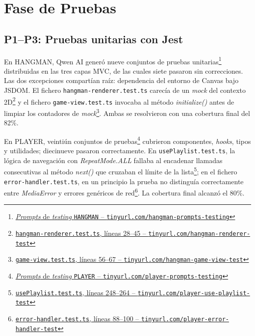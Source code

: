 \section{Fase de Pruebas} \label{sec:dev-testing}

\subsection{P1--P3: Pruebas unitarias con Jest}

En \ac{HANGMAN}, Qwen AI generó nueve conjuntos de pruebas unitarias\footnote{\href{https://github.com/alu0101549491/TFG-Fabian-Gonzalez-Lence/tree/main/resources/prompts/1-TheHangmanGame/5-TestingPorModulo}{\textit{Prompts} de \textit{testing} \texttt{HANGMAN} -- \texttt{tinyurl.com/hangman-prompts-testing}}} distribuidas en las tres capas \ac{MVC}, de las cuales siete pasaron sin correcciones. Las dos excepciones compartían raíz: dependencia del entorno de Canvas bajo JSDOM. El fichero \texttt{hangman-renderer.test.ts} carecía de un \textit{mock} del contexto 2D\footnote{\href{https://github.com/alu0101549491/TFG-Fabian-Gonzalez-Lence/blob/main/projects/1-TheHangmanGame/tests/views/hangman-renderer.test.ts\#L28-L45}{\texttt{hangman-renderer.test.ts}, líneas 28--45 -- \texttt{tinyurl.com/hangman-renderer-test}}} y el fichero \texttt{game-view.test.ts} invocaba al método \textit{initialize()} antes de limpiar los contadores de \textit{mock}\footnote{\href{https://github.com/alu0101549491/TFG-Fabian-Gonzalez-Lence/blob/main/projects/1-TheHangmanGame/tests/views/game-view.test.ts\#L56-L67}{\texttt{game-view.test.ts}, líneas 56--67 -- \texttt{tinyurl.com/hangman-game-view-test}}}. Ambas se resolvieron con una cobertura final del 82\%.

En \ac{PLAYER}, veintiún conjuntos de pruebas\footnote{\href{https://github.com/alu0101549491/TFG-Fabian-Gonzalez-Lence/tree/main/resources/prompts/2-MusicWebPlayer/5-TestingPorModulo}{\textit{Prompts} de \textit{testing} \texttt{PLAYER} -- \texttt{tinyurl.com/player-prompts-testing}}} cubrieron componentes, \textit{hooks}, tipos y utilidades; diecinueve pasaron correctamente. En \texttt{usePlaylist.test.ts}, la lógica de navegación con \textit{RepeatMode.ALL} fallaba al encadenar llamadas consecutivas al método \textit{next()} que cruzaban el límite de la lista\footnote{\href{https://github.com/alu0101549491/TFG-Fabian-Gonzalez-Lence/blob/main/projects/2-MusicWebPlayer/tests/hooks/usePlaylist.test.ts\#L248-L264}{\texttt{usePlaylist.test.ts}, líneas 248--264 -- \texttt{tinyurl.com/player-use-playlist-test}}}; en el fichero \texttt{error-handler.test.ts}, en un principio la prueba no distinguía correctamente entre \textit{MediaError} y errores genéricos de red\footnote{\href{https://github.com/alu0101549491/TFG-Fabian-Gonzalez-Lence/blob/main/projects/2-MusicWebPlayer/tests/utils/error-handler.test.ts\#L88-L100}{\texttt{error-handler.test.ts}, líneas 88--100 -- \texttt{tinyurl.com/player-error-handler-test}}}. La cobertura final alcanzó el 80\%.

